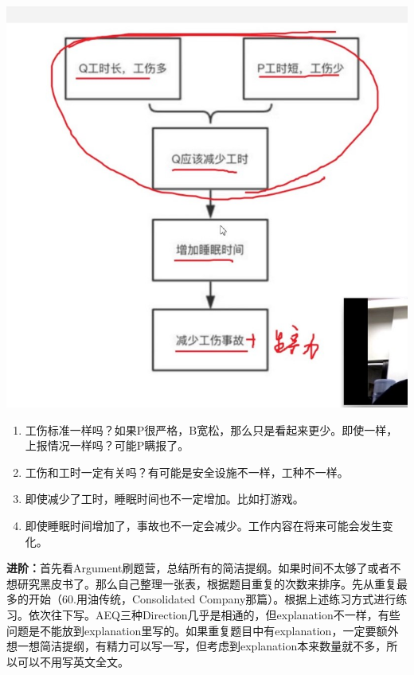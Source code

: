 \documentclass[cn,plain]{./src/qyxfbook}
\begin{document}
			
			\begin{center}
				\includegraphics[scale=0.5]{illus1.jpg}
			\end{center}
			
			\begin{enumerate}
			\item 工伤标准一样吗？如果P很严格，B宽松，那么只是看起来更少。即使一样，上报情况一样吗？可能P瞒报了。

		\item 工伤和工时一定有关吗？有可能是安全设施不一样，工种不一样。

		\item 即使减少了工时，睡眠时间也不一定增加。比如打游戏。

		\item 即使睡眠时间增加了，事故也不一定会减少。工作内容在将来可能会发生变化。\par
		\end{enumerate}
			
			\textbf{进阶：}首先看Argument刷题营，总结所有的简洁提纲。如果时间不太够了或者不想研究黑皮书了。那么自己整理一张表，根据题目重复的次数来排序。先从重复最多的开始（60.用油传统，Consolidated Company那篇）。根据上述练习方式进行练习。依次往下写。AEQ三种Direction几乎是相通的，但explanation不一样，有些问题是不能放到explanation里写的。如果重复题目中有explanation，一定要额外想一想简洁提纲，有精力可以写一写，但考虑到explanation本来数量就不多，所以可以不用写英文全文。\par
			
\end{document}
